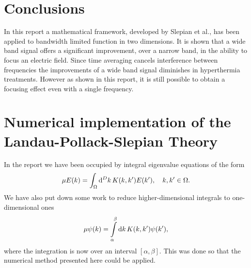 \documentclass[11pt,a4paper, 
swedish,english %
]{article}
\begin{document}
\section{Conclusions}
In this report a mathematical framework, developed by Slepian et al.,
has been applied to bandwidth limited function in two dimensions. It
is shown that a wide band signal offers a significant improvement,
over a narrow band, in the ability to focus an electric field.
Since time averaging cancels interference
between frequencies the improvements of a wide band signal diminishes
in hyperthermia treatments. However as shown in this report, it is
still possible to obtain a focusing effect even with a single
frequency.






\clearpage %
\appendix  %


\section{Numerical implementation of the 
Landau-Pollack-Slepian Theory}
\label{apx:num}
In the report we have been occupied by integral eigenvalue
equations of the form
\begin{equation} %
\mu E(k) 
= \oldint_{\Omega} \rd^D{k}\, K(k, k') E(k')
\qcomma k, k'\in\Omega.
\end{equation}
We have also put down some work to reduce higher-dimensional
integrals to one-dimensional ones
\begin{equation} \label{eq:int-eig}
\mu \psi(k) 
= \int_{\alpha}^\beta \rd{k}\, K(k, k') \psi(k'),
\end{equation}
where the integration is now over an interval 
$[\alpha, \beta]$. This was done so that the numerical method
presented here could be applied. 
\end{document}
